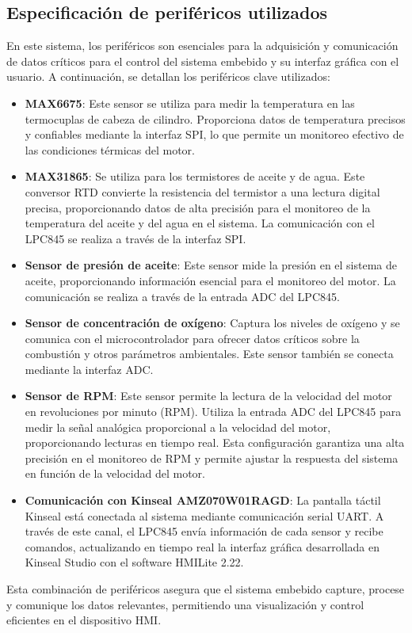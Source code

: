 \subsection{Especificación de periféricos utilizados}

En este sistema, los periféricos son esenciales para la adquisición y comunicación de datos críticos para el control del sistema embebido y su interfaz gráfica con el usuario. A continuación, se detallan los periféricos clave utilizados:

\begin{itemize}
    \item \textbf{MAX6675}: Este sensor se utiliza para medir la temperatura en las termocuplas de cabeza de cilindro. Proporciona datos de temperatura precisos y confiables mediante la interfaz SPI, lo que permite un monitoreo efectivo de las condiciones térmicas del motor.
    
    \item \textbf{MAX31865}: Se utiliza para los termistores de aceite y de agua. Este conversor RTD convierte la resistencia del termistor a una lectura digital precisa, proporcionando datos de alta precisión para el monitoreo de la temperatura del aceite y del agua en el sistema. La comunicación con el LPC845 se realiza a través de la interfaz SPI.

    \item \textbf{Sensor de presión de aceite}: Este sensor mide la presión en el sistema de aceite, proporcionando información esencial para el monitoreo del motor. La comunicación se realiza a través de la entrada ADC del LPC845.

    \item \textbf{Sensor de concentración de oxígeno}: Captura los niveles de oxígeno y se comunica con el microcontrolador para ofrecer datos críticos sobre la combustión y otros parámetros ambientales. Este sensor también se conecta mediante la interfaz ADC.

    \item \textbf{Sensor de RPM}: Este sensor permite la lectura de la velocidad del motor en revoluciones por minuto (RPM). Utiliza la entrada ADC del LPC845 para medir la señal analógica proporcional a la velocidad del motor, proporcionando lecturas en tiempo real. Esta configuración garantiza una alta precisión en el monitoreo de RPM y permite ajustar la respuesta del sistema en función de la velocidad del motor.

    \item \textbf{Comunicación con Kinseal AMZ070W01RAGD}: La pantalla táctil Kinseal está conectada al sistema mediante comunicación serial UART. A través de este canal, el LPC845 envía información de cada sensor y recibe comandos, actualizando en tiempo real la interfaz gráfica desarrollada en Kinseal Studio con el software HMILite 2.22.
\end{itemize}

Esta combinación de periféricos asegura que el sistema embebido capture, procese y comunique los datos relevantes, permitiendo una visualización y control eficientes en el dispositivo HMI.
